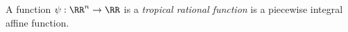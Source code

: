 

    A function $\psi: \RR^n\to \RR$ is a \emph{tropical rational function} is a piecewise integral affine function. 

